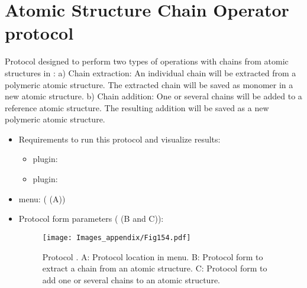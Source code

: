 \section{Atomic Structure Chain Operator protocol}
\label{app:atomStructUtilsOperatorProtocol}%
Protocol designed to perform two types of operations with chains from atomic structures in \scipion: a) Chain extraction: An individual chain will be extracted from a polymeric atomic structure. The extracted chain will be saved as monomer in a new atomic structure. b) Chain addition: One or several chains will be added to a reference atomic structure. The resulting addition will be saved as a new polymeric atomic structure. 

\begin{itemize}
 \item Requirements to run this protocol and visualize results:
    \begin{itemize}
        \item \scipion plugin: 
        \item \scipion plugin: 
    \end{itemize}
 \item \scipion menu:
   ( (A))
  
 \item Protocol form parameters ( (B and C)):
 
 \begin{figure}[H]
     \centering 
     \captionsetup{width=.7\linewidth} 
     \texttt{[image: Images\_appendix/Fig154.pdf]}
     \caption{Protocol . A: Protocol location in \scipion menu. B: Protocol form to extract a chain from an atomic structure. C: Protocol form to add one or several chains to an atomic structure.}
     \label{fig:app_protocol_atomstructutils_operator_1}
    \end{figure}
    

\end{itemize}
